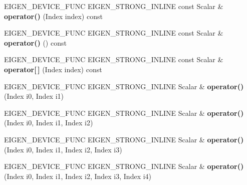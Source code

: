 \begin{DoxyCompactItemize}
\item 
\mbox{\label{class_eigen_1_1_tensor_af7543d3acfec8f5775398d58316e6b0d}} 
E\+I\+G\+E\+N\+\_\+\+D\+E\+V\+I\+C\+E\+\_\+\+F\+U\+NC E\+I\+G\+E\+N\+\_\+\+S\+T\+R\+O\+N\+G\+\_\+\+I\+N\+L\+I\+NE const Scalar \& {\bfseries operator()} (Index index) const
\item 
\mbox{\label{class_eigen_1_1_tensor_afc84f95c348b742c73adc8160b1c2c3a}} 
E\+I\+G\+E\+N\+\_\+\+D\+E\+V\+I\+C\+E\+\_\+\+F\+U\+NC E\+I\+G\+E\+N\+\_\+\+S\+T\+R\+O\+N\+G\+\_\+\+I\+N\+L\+I\+NE const Scalar \& {\bfseries operator()} () const
\item 
\mbox{\label{class_eigen_1_1_tensor_a114c73b222119386bd5df7c7702186d6}} 
E\+I\+G\+E\+N\+\_\+\+D\+E\+V\+I\+C\+E\+\_\+\+F\+U\+NC E\+I\+G\+E\+N\+\_\+\+S\+T\+R\+O\+N\+G\+\_\+\+I\+N\+L\+I\+NE const Scalar \& {\bfseries operator\mbox{[}$\,$\mbox{]}} (Index index) const
\item 
\mbox{\label{class_eigen_1_1_tensor_a627a817dab4f05c53deea8854cd68af6}} 
E\+I\+G\+E\+N\+\_\+\+D\+E\+V\+I\+C\+E\+\_\+\+F\+U\+NC E\+I\+G\+E\+N\+\_\+\+S\+T\+R\+O\+N\+G\+\_\+\+I\+N\+L\+I\+NE Scalar \& {\bfseries operator()} (Index i0, Index i1)
\item 
\mbox{\label{class_eigen_1_1_tensor_a6b7933eae10efb4c040e2ba9178a1dec}} 
E\+I\+G\+E\+N\+\_\+\+D\+E\+V\+I\+C\+E\+\_\+\+F\+U\+NC E\+I\+G\+E\+N\+\_\+\+S\+T\+R\+O\+N\+G\+\_\+\+I\+N\+L\+I\+NE Scalar \& {\bfseries operator()} (Index i0, Index i1, Index i2)
\item 
\mbox{\label{class_eigen_1_1_tensor_a33b1b8d83c3e38ac67bd0eb4f93d5a01}} 
E\+I\+G\+E\+N\+\_\+\+D\+E\+V\+I\+C\+E\+\_\+\+F\+U\+NC E\+I\+G\+E\+N\+\_\+\+S\+T\+R\+O\+N\+G\+\_\+\+I\+N\+L\+I\+NE Scalar \& {\bfseries operator()} (Index i0, Index i1, Index i2, Index i3)
\item 
\mbox{\label{class_eigen_1_1_tensor_a5fb4688bcb63a278563e92368d063de7}} 
E\+I\+G\+E\+N\+\_\+\+D\+E\+V\+I\+C\+E\+\_\+\+F\+U\+NC E\+I\+G\+E\+N\+\_\+\+S\+T\+R\+O\+N\+G\+\_\+\+I\+N\+L\+I\+NE Scalar \& {\bfseries operator()} (Index i0, Index i1, Index i2, Index i3, Index i4)
\item 

\end{DoxyCompactItemize}
